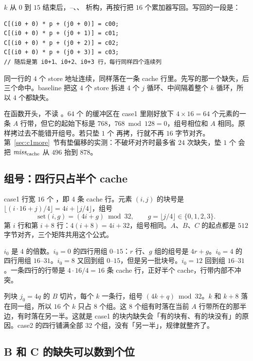 $k$ 从 $0$ 到 $15$ 结束后，--、、 析构，再按行把 $16$ 个累加器写回。写回的一段是：

\begin{lstlisting}
C[(i0 + 0) * p + (j0 + 0)] = c00;
C[(i0 + 0) * p + (j0 + 1)] = c01;
C[(i0 + 0) * p + (j0 + 2)] = c02;
C[(i0 + 0) * p + (j0 + 3)] = c03;
// 随后是第 i0+1、i0+2、i0+3 行，每行同样四个连续列
\end{lstlisting}

同一行的 $4$ 个 store 地址连续，同样落在一条 cache 行里。先写的那一个缺失，后三个命中。baseline 把这 $4$ 个 store 拆进 $4$ 个 $j$ 循环、中间隔着整个 $k$ 循环，所以 $4$ 个都缺失。

 在函数开头，不读 。$64$ 个  的缓冲区在 case1 里刚好放下 $4\times16=64$ 个元素的一条 $A$ 行带，但它的起始下标是 $768$，$768\bmod 128=0$，组号相位和 $A$ 相同。原样拷过去不能错开组号。若只垫 $1$ 个  再拷，行就不再 $16$ 字节对齐。第~\ref{sec:c1more}~节有垫偏移的实测：不破坏对齐时最多省 $24$ 次缺失，垫 $1$ 个  会把 $\mathit{miss}_{\mathrm{cache}}$ 从 $496$ 抬到 $878$。

\subsection{组号：四行只占半个 cache}
\label{sec:c1map}

case1 行宽 $16$ 个 ，即 $4$ 条 cache 行。元素 $(i,j)$ 的块号是 $\lfloor(i\cdot16+j)/4\rfloor=4i+\lfloor j/4\rfloor$，组号
\begin{equation}
\label{eq:c1set}
\mathrm{set}(i,g)=(4i+g)\bmod 32,\qquad g=\lfloor j/4\rfloor\in\{0,1,2,3\}.
\end{equation}
第 $i$ 行和第 $i+8$ 行：$4(i+8)=4i+32$，组号相同。$A$、$B$、$C$ 的起点都是 $512$ 字节对齐，三个矩阵共用这个公式。

$i_0$ 是 $4$ 的倍数。$i_0=0$ 的四行用组 $0$--$15$：$r$ 行、$g$ 组的组号是 $4r+g$。$i_0=4$ 的四行用组 $16$--$31$。$i_0=8$ 又回到组 $0$--$15$，但是另一批块号。$i_0=12$ 回到组 $16$--$31$。一条四行的行带是 $4\cdot16/4=16$ 条 cache 行，正好半个 cache，行带内部不冲突。

列块 $j_0=4q$ 的 $B$ 切片，每个 $k$ 一条行，组号 $(4k+q)\bmod 32$。$k$ 和 $k+8$ 落在同一组，所以 $16$ 个 $k$ 只占 $8$ 个组。这 $8$ 个组有时落在当前 $A$ 行带所在的那半边，有时落在另一半。这就是 case1 的块内缺失会「有的块有、有的块没有」的原因。case2 的四行铺满全部 $32$ 个组，没有「另一半」，规律就整齐了。

\subsection{B 和 C 的缺失可以数到个位}

